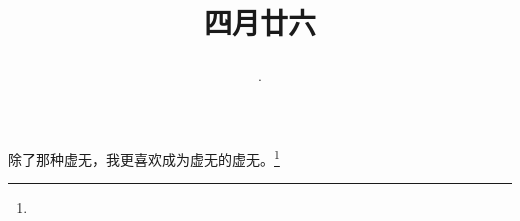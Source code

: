\title{\date[d=2,m=6,y=2024][year:cn-y,年,month:cn,day:cn,日,·,weekday]·四月廿六 }
除了那种虚无，我更喜欢成为虚无的虚无。\footnote{ }

